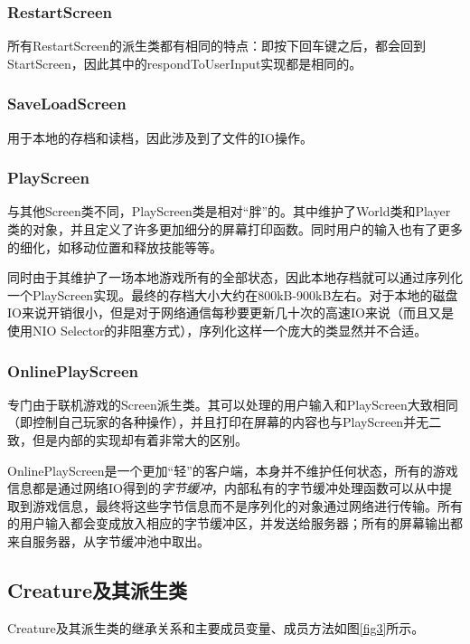 \documentclass{SCIS2022cn}
\begin{document}
\subsubsection{RestartScreen}
所有RestartScreen的派生类都有相同的特点：即按下回车键之后，都会回到StartScreen，因此其中的respondToUserInput实现都是相同的。

\subsubsection{SaveLoadScreen}
用于本地的存档和读档，因此涉及到了文件的IO操作。

\subsubsection{PlayScreen}
与其他Screen类不同，PlayScreen类是相对“胖”的。其中维护了World类和Player类的对象，并且定义了许多更加细分的屏幕打印函数。同时用户的输入也有了更多的细化，如移动位置和释放技能等等。

同时由于其维护了一场本地游戏所有的全部状态，因此本地存档就可以通过序列化一个PlayScreen实现。最终的存档大小大约在800kB-900kB左右。对于本地的磁盘IO来说开销很小，但是对于网络通信每秒要更新几十次的高速IO来说（而且又是使用NIO Selector的非阻塞方式），序列化这样一个庞大的类显然并不合适。

\subsubsection{OnlinePlayScreen}
专门由于联机游戏的Screen派生类。其可以处理的用户输入和PlayScreen大致相同（即控制自己玩家的各种操作），并且打印在屏幕的内容也与PlayScreen并无二致，但是内部的实现却有着非常大的区别。

OnlinePlayScreen是一个更加“轻”的客户端，本身并不维护任何状态，所有的游戏信息都是通过网络IO得到的\emph{字节缓冲}，内部私有的字节缓冲处理函数可以从中提取到游戏信息，最终将这些字节信息而不是序列化的对象通过网络进行传输。所有的用户输入都会变成放入相应的字节缓冲区，并发送给服务器；所有的屏幕输出都来自服务器，从字节缓冲池中取出。

\subsection{Creature及其派生类}

Creature及其派生类的继承关系和主要成员变量、成员方法如图\ref{fig3}所示。
\end{document}
